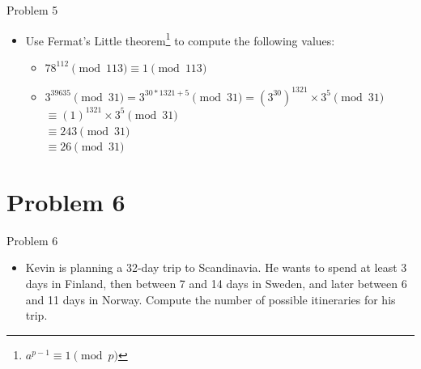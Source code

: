 \documentclass{beamer}
\begin{document}
\begin{frame}{Problem 5}
    \begin{itemize} 
        \item Use Fermat's Little theorem\footnote{$a^{p - 1} \equiv 1 \pmod{p}$} to compute the following values:
        \begin{itemize}
            \item $78^{112} \pmod{113} \equiv 1 \pmod{113}$
            \item $3^{39635} \pmod{31}  = 3^{30 * 1321 + 5} \pmod{31} = (3^{30})^{1321}\times3^5 \pmod{31}$ \\
                                        \hspace{2.6cm}$\equiv (1)^{1321}\times3^5 \pmod{31}$ \\
                                        \hspace{2.6cm}$\equiv 243 \pmod{31}$ \\
                                        \hspace{2.6cm}$\equiv 26 \pmod{31}$ 
        \end{itemize}
    \end{itemize}
\end{frame}

\section{Problem 6}

\begin{frame}{Problem 6}
   \begin{itemize} 
        \item Kevin is planning a 32-day trip to Scandinavia. He wants to spend at least 3 days in Finland, then between 7 and 14 days in Sweden, and later between 6 and 11 days in Norway. Compute the number of possible itineraries for his trip.
    \end{itemize}
\end{frame}
\end{document}

